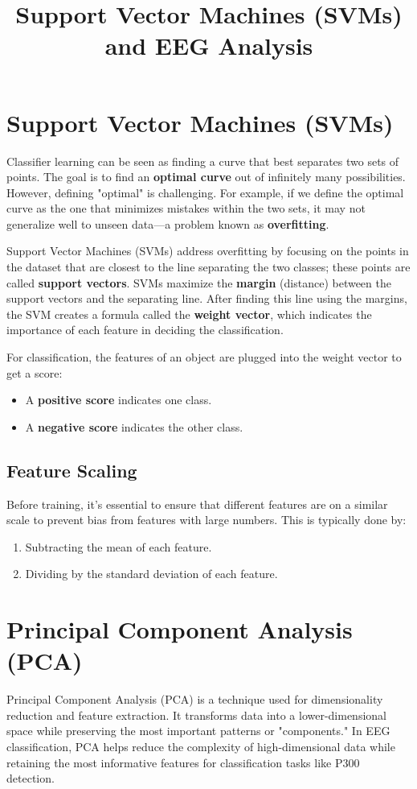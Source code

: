 \documentclass{article}
\title{Support Vector Machines (SVMs) and EEG Analysis}
\author{}
\date{}
\begin{document}
\maketitle

\section{Support Vector Machines (SVMs)}
Classifier learning can be seen as finding a curve that best separates two sets of points. The goal is to find an \textbf{optimal curve} out of infinitely many possibilities. However, defining "optimal" is challenging. For example, if we define the optimal curve as the one that minimizes mistakes within the two sets, it may not generalize well to unseen data—a problem known as \textbf{overfitting}.

Support Vector Machines (SVMs) address overfitting by focusing on the points in the dataset that are closest to the line separating the two classes; these points are called \textbf{support vectors}. SVMs maximize the \textbf{margin} (distance) between the support vectors and the separating line. After finding this line using the margins, the SVM creates a formula called the \textbf{weight vector}, which indicates the importance of each feature in deciding the classification.

For classification, the features of an object are plugged into the weight vector to get a score:
\begin{itemize}
    \item A \textbf{positive score} indicates one class.
    \item A \textbf{negative score} indicates the other class.
\end{itemize}

\subsection{Feature Scaling}
Before training, it’s essential to ensure that different features are on a similar scale to prevent bias from features with large numbers. This is typically done by:
\begin{enumerate}
    \item Subtracting the mean of each feature.
    \item Dividing by the standard deviation of each feature.
\end{enumerate}

\section{Principal Component Analysis (PCA)}
Principal Component Analysis (PCA) is a technique used for dimensionality reduction and feature extraction. It transforms data into a lower-dimensional space while preserving the most important patterns or "components." In EEG classification, PCA helps reduce the complexity of high-dimensional data while retaining the most informative features for classification tasks like P300 detection.
\end{document}
